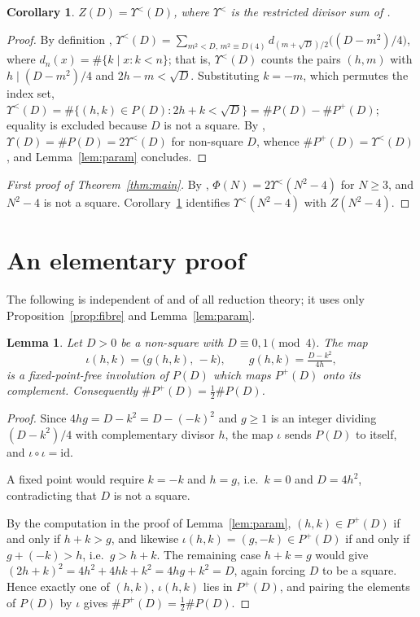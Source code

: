 \documentclass[11pt,reqno]{amsart}
\theoremstyle{plain}
\newtheorem{lemma}[theorem]{Lemma}
\newtheorem{corollary}[theorem]{Corollary}
\theoremstyle{definition}
\begin{document}
\begin{corollary}\label{cor:upsilon}
$Z(D)=\Upsilon^{<}(D)$, where $\Upsilon^{<}$ is the restricted divisor sum of
\cite[(3.3)]{Technau}.
\end{corollary}

\begin{proof}
By definition \cite[(3.3)]{Technau},
$\Upsilon^{<}(D)=\sum_{m^2<D,\,m^2\equiv D(4)}d_{(m+\sqrt D)/2}\bigl((D-m^2)/4\bigr)$,
where $d_n(x)=\#\{k\mid x: k<n\}$; that is, $\Upsilon^{<}(D)$ counts the pairs $(h,m)$
with $h\mid (D-m^2)/4$ and $2h-m<\sqrt D$. Substituting $k=-m$, which permutes the index
set, $\Upsilon^{<}(D)=\#\{(h,k)\in P(D): 2h+k<\sqrt D\}=\#P(D)-\#P^{+}(D)$; equality is
excluded because $D$ is not a square. By \cite[Lemma~4]{Technau},
$\Upsilon(D)=\#P(D)=2\Upsilon^{<}(D)$ for non-square $D$, whence
$\#P^{+}(D)=\Upsilon^{<}(D)$, and Lemma~\ref{lem:param} concludes.
\end{proof}

\begin{proof}[First proof of Theorem~\ref{thm:main}]
By \cite[(3.2)]{Technau}, $\Phi(N)=2\Upsilon^{<}(N^2-4)$ for $N\ge3$, and
$N^2-4$ is not a square. Corollary~\ref{cor:upsilon} identifies $\Upsilon^{<}(N^2-4)$
with $Z(N^2-4)$.
\end{proof}

\section{An elementary proof}\label{sec:involution}

The following is independent of \cite{Technau} and of all reduction theory; it uses only
Proposition~\ref{prop:fibre} and Lemma~\ref{lem:param}.

\begin{lemma}\label{lem:invol}
Let $D>0$ be a non-square with $D\equiv0,1\pmod4$. The map
\[
  \iota(h,k)=\bigl(g(h,k),\,-k\bigr),\qquad g(h,k)=\tfrac{D-k^2}{4h},
\]
is a fixed-point-free involution of $P(D)$ which maps $P^{+}(D)$ onto its complement.
Consequently $\#P^{+}(D)=\tfrac12\#P(D)$.
\end{lemma}

\begin{proof}
Since $4hg=D-k^2=D-(-k)^2$ and $g\ge1$ is an integer dividing $(D-k^2)/4$ with
complementary divisor $h$, the map $\iota$ sends $P(D)$ to itself, and
$\iota\circ\iota=\mathrm{id}$.

A fixed point would require $k=-k$ and $h=g$, i.e.\ $k=0$ and $D=4h^2$, contradicting
that $D$ is not a square.

By the computation in the proof of Lemma~\ref{lem:param}, $(h,k)\in P^{+}(D)$ if and
only if $h+k>g$, and likewise $\iota(h,k)=(g,-k)\in P^{+}(D)$ if and only if
$g+(-k)>h$, i.e.\ $g>h+k$. The remaining case $h+k=g$ would give
$(2h+k)^2=4h^2+4hk+k^2=4hg+k^2=D$, again forcing $D$ to be a square. Hence exactly one
of $(h,k)$, $\iota(h,k)$ lies in $P^{+}(D)$, and pairing the elements of $P(D)$ by
$\iota$ gives $\#P^{+}(D)=\frac12\#P(D)$.
\end{proof}
\end{document}
